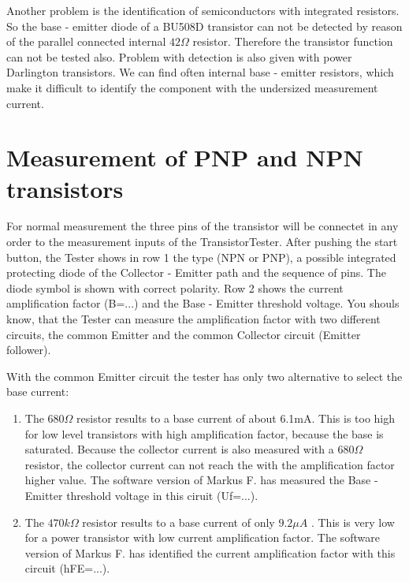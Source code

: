 Another problem is the identification of semiconductors with integrated resistors.
So the base - emitter diode of a BU508D transistor can not be detected by reason of the parallel connected
internal \(42 \Omega\) resistor.
Therefore the transistor function can not be tested also.
Problem with detection is also given with power Darlington transistors. We can find often internal
base - emitter resistors, which make it difficult to identify the component with the undersized measurement current.

\section{Measurement of PNP and NPN transistors}
For normal measurement the three pins of the transistor will be connectet in any order to the measurement
inputs of the TransistorTester.
After pushing the start button, the Tester shows in row 1 the type (NPN or PNP), 
a possible integrated protecting diode of the Collector - Emitter path and the
sequence of pins. The diode symbol is shown with correct polarity.
Row 2 shows the current amplification factor (B=...) and the Base - Emitter threshold voltage.
You shouls know, that the Tester can measure the amplification factor with two different circuits,
the common Emitter and the common Collector circuit (Emitter follower).


With the common Emitter circuit the tester has only two alternative to select the base current:
\begin{enumerate}
\item The \(680 \Omega\) resistor results to a base current of about 6.1mA. 
This is too high for low level transistors with high amplification factor, because the base is saturated.
Because the collector current is also measured with a \(680 \Omega\) resistor, the collector current
can not reach the with the amplification factor higher value.
The software version of Markus F. has measured the Base - Emitter threshold voltage in this ciruit (Uf=...).\\
\item The \(470 k\Omega\) resistor results to a base current of only \(9.2 \mu A\) .
This is very low for a power transistor with low current amplification factor.
The software version of Markus F. has identified the current amplification factor with this circuit (hFE=...).\\
\end{enumerate}

